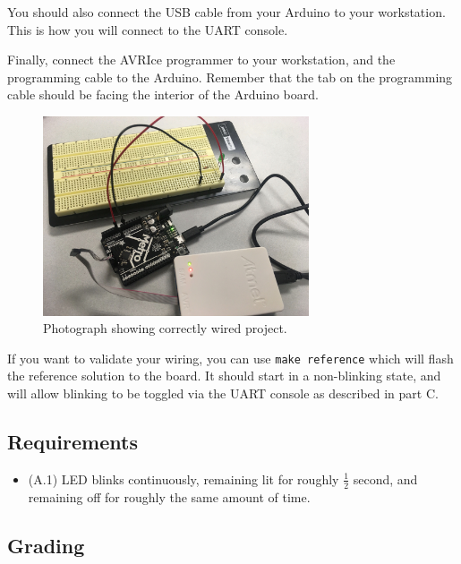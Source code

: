 \documentclass{article}
\begin{document}
You should also connect the USB cable from your Arduino to your workstation.
This is how you will connect to the UART console.

Finally, connect the AVRIce programmer to your workstation, and the programming
cable to the Arduino. Remember that the tab on the programming cable should be
facing the interior of the Arduino board.

\begin{figure}[H]
	\centering

	\includegraphics[max width = 0.7\textwidth]{wiring.jpg}

	\caption{Photograph showing correctly wired project.}

\end{figure}

If you want to validate your wiring, you can use \texttt{make reference} which
will flash the reference solution to the board. It should start in a
non-blinking state, and will allow blinking to be toggled via the UART console
as described in part C.

\subsection{Requirements}

\begin{itemize}

	\item (A.1) LED blinks continuously, remaining lit for roughly
	$\frac{1}{2}$ second, and remaining off for roughly the same amount
	of time.

\end{itemize}

\subsection{Grading}
\end{document}
